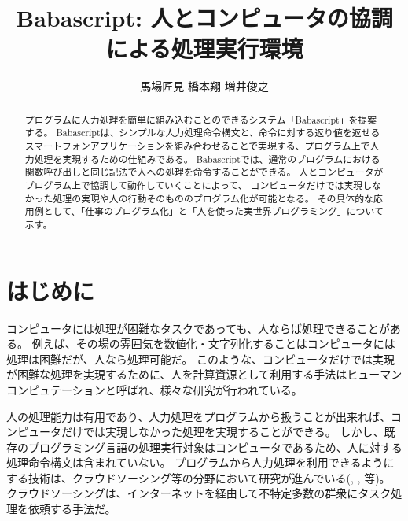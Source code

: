 \documentclass[twoside]{wiss}
\begin{document}
\title{Babascript: 人とコンピュータの協調による処理実行環境}
\etitle{} %

\author{{馬場匠見} \hspace{1em}
        {橋本翔} \hspace{1em}
        {増井俊之
        }
        }

\begin{abstract}
プログラムに人力処理を簡単に組み込むことのできるシステム「Babascript」を提案する。
Babascriptは、シンプルな人力処理命令構文と、命令に対する返り値を返せるスマートフォンアプリケーションを組み合わせることで実現する、プログラム上で人力処理を実現するための仕組みである。
Babascriptでは、通常のプログラムにおける関数呼び出しと同じ記法で人への処理を命令することができる。
人とコンピュータがプログラム上で協調して動作していくことによって、
コンピュータだけでは実現しなかった処理の実現や人の行動そのもののプログラム化が可能となる。
その具体的な応用例として、「仕事のプログラム化」と「人を使った実世界プログラミング」について示す。
\end{abstract}

\maketitle

\section{はじめに}
コンピュータには処理が困難なタスクであっても、人ならば処理できることがある。
例えば、その場の雰囲気を数値化・文字列化することはコンピュータには処理は困難だが、人なら処理可能だ。
このような、コンピュータだけでは実現が困難な処理を実現するために、人を計算資源として利用する手法はヒューマンコンピュテーション\cite{humancomputation}と呼ばれ、様々な研究が行われている。

人の処理能力は有用であり、人力処理をプログラムから扱うことが出来れば、コンピュータだけでは実現しなかった処理を実現することができる。
しかし、既存のプログラミング言語の処理実行対象はコンピュータであるため、人に対する処理命令構文は含まれていない。
プログラムから人力処理を利用できるようにする技術は、クラウドソーシング等の分野において研究が進んでいる(\cite{automan}, \cite{crowddb}, \cite{crowdforge}等)。
クラウドソーシングは、インターネットを経由して不特定多数の群衆にタスク処理を依頼する手法だ\cite{riseofcrowdsourcing}。
\end{document}
